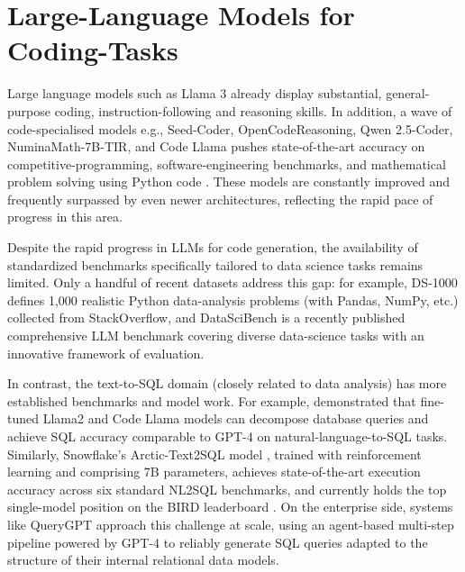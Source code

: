 


\section{Large-Language Models for Coding-Tasks}

Large language models such as Llama 3 \citep{Grattafiori2024Llama3} already display substantial, general-purpose coding, instruction-following and reasoning skills. In addition, a wave of code-specialised models e.g., Seed-Coder, OpenCodeReasoning, Qwen 2.5-Coder, NuminaMath-7B-TIR, and Code Llama pushes state-of-the-art accuracy on competitive-programming, software-engineering benchmarks, and mathematical problem solving using Python code \citep{Seed2025SeedCoder, Ahmad2025OCRNVidia, Hui2024Qwen25Coder, Roziere2024CodeLlama, Moshkov2025AIMO2, Yin2024MuMathCode, Gou2024ToRA}. These models are constantly improved and frequently surpassed by even newer architectures, reflecting the rapid pace of progress in this area.

Despite the rapid progress in LLMs for code generation, the availability of standardized benchmarks specifically tailored to data science tasks remains limited. Only a handful of recent datasets address this gap: for example, DS‑1000 \citep{Lai2022DS1000} defines 1,000 realistic Python data-analysis problems (with Pandas, NumPy, etc.) collected from StackOverflow, and DataSciBench \citep{Zhang2025DataSciBench} is a recently published comprehensive LLM benchmark covering diverse data-science tasks with an innovative framework of evaluation.

In contrast, the text-to-SQL domain (closely related to data analysis) has more established benchmarks and model work. For example, \cite{Dominguez2024BlarSQL} demonstrated that fine-tuned Llama2 and Code Llama models can decompose database queries and achieve SQL accuracy comparable to GPT-4 on natural-language-to-SQL tasks. Similarly, Snowflake's Arctic-Text2SQL model \citep{Yao2025ArcticText2SQLR1}, trained with reinforcement learning and comprising 7B parameters, achieves state-of-the-art execution accuracy across six standard NL2SQL benchmarks, and currently holds the top single-model position on the BIRD leaderboard \citep{Li2023BirdSQL}. On the enterprise side, systems like QueryGPT \citep{Uber2024QueryGPT} approach this challenge at scale, using an agent-based multi-step pipeline powered by GPT-4 to reliably generate SQL queries adapted to the structure of their internal relational data models.


